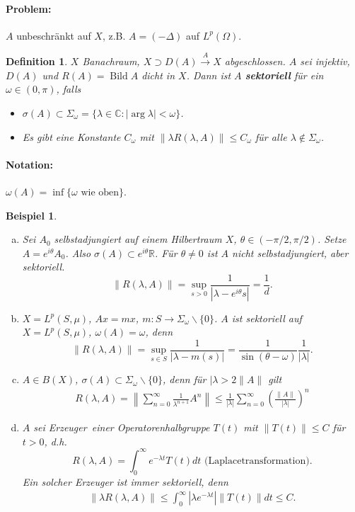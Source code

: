 \documentclass[12pt]{extreport} %
\newtheorem{Definition}[Satz]{Definition}
\newtheorem{Beispiel}[Satz]{Beispiel}
\DeclareMathOperator{\Bild}{Bild}
\numberwithin{equation}{section}
\newcommand{\C}{\mathbb{C}} %
\newcommand{\R}{\mathbb{R}} %
\newcommand{\om}{\omega}
\newcommand{\laplace}{\Delta}
\begin{document}
	\paragraph{Problem:} $A$ unbeschränkt auf $X$, z.B. $A = (-\laplace)$ auf $L^p(\Omega)$.
	
	\begin{Definition}
		$X$ Banachraum, $X\supset D(A)\overset{A}{\rightarrow} X$ abgeschlossen. $A$ sei injektiv, $D(A)$ und $R(A) = \Bild A$ dicht in $X$. Dann ist $A$ \textbf{sektoriell} für ein $\om\in (0,\pi)$, falls 
		\begin{itemize}
			\item $\sigma(A)\subset \Sigma_\om = \{\lambda\in \C\colon |\arg\lambda|<\om \}$.
			\item Es gibt eine Konstante $C_\om$ mit $\|\lambda R(\lambda, A)\| \leq C_\om$ für alle $\lambda\notin \Sigma_\om$.
		\end{itemize}
	\end{Definition}
	
	\paragraph{Notation:} $\om(A) = \inf\{\om \text{ wie oben}\}$.
	
	\begin{Beispiel}
		~
		\begin{enumerate}[a)]
			\item Sei $A_0$ selbstadjungiert auf einem Hilbertraum $X$, $\theta\in (-\pi/2,\pi/2)$. Setze $A= e^{i\theta} A_0$. Also $\sigma(A)\subset e^{i\theta}\R$. Für $\theta \neq 0$ ist $A$ nicht selbstadjungiert, aber sektoriell. 
			$$\|R(\lambda, A)\| = \sup_{s>0}\frac{1}{|\lambda-e^{i\theta}s|} = \frac{1}{d}.$$
			\item $X= L^p(S,\mu)$, $Ax = mx$, $m\colon S\rightarrow \Sigma_\om\backslash\{0\}$. $A$ ist sektoriell auf $X = L^p(S,\mu)$, $\om(A)= \om$, denn 
			$$\|R(\lambda, A)\|= \sup_{s\in S} \frac{1}{|\lambda - m(s)|} = \frac{1}{\sin(\theta-\om)} \frac{1}{|\lambda|}.$$
			\item $A\in B(X)$, $\sigma(A)\subset \Sigma_\om \backslash\{0\}$, denn für $|\lambda >2\|A\|$ gilt
			\begin{align*}
				R(\lambda, A) =\left\| \sum_{n = 0}^{\infty} \frac{1}{\lambda^{n+1}}A^n\right\| \leq \frac{1}{|\lambda|} \sum_{n = 0}^\infty \left(\frac{\|A\|}{|\lambda|} \right)^n
			\end{align*}
			\item $A$ sei \glqq Erzeuger\grqq\ einer Operatorenhalbgruppe $T(t)$ mit $\|T(t)\|\leq C$ für $t>0$, d.h. 
			$$R(\lambda, A) = \int_{0}^{\infty} e^{-\lambda t}T(t) dt \text{ (Laplacetransformation)}.$$
			Ein solcher Erzeuger ist immer sektoriell, denn 
			\begin{align*}
				\|\lambda R(\lambda, A)\|\leq \int_0^\infty |\lambda e^{-\lambda t}| \|T(t)\| dt\leq C.
			\end{align*}
		\end{enumerate}
	\end{Beispiel}
	
\end{document}
